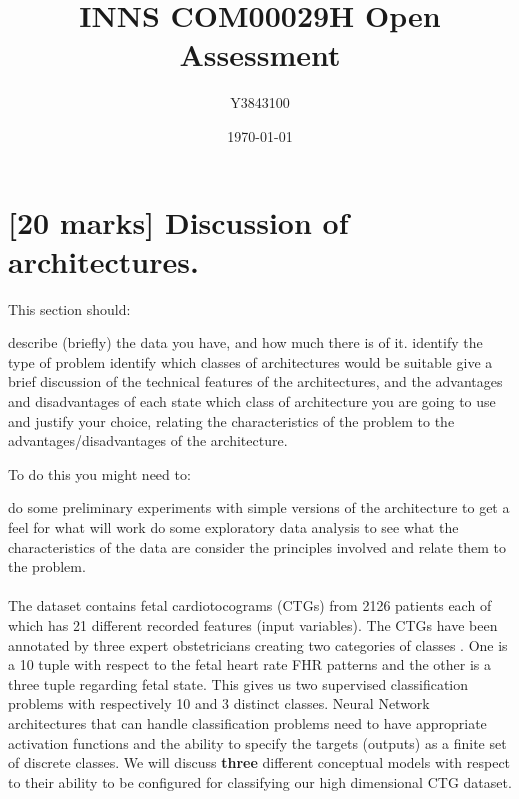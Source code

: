 \documentclass[11pt,a4paper]{article}
\title{INNS COM00029H Open Assessment}
\author{Y3843100}
\date{\today}
\begin{document}


\maketitle


\section{[20 marks] Discussion of architectures.}
\label{sec:discussion}
This section should:
\begin{outline}
  \1 describe (briefly) the data you have, and how much there is of it.
  \1 identify the type of problem
  \1 identify which classes of architectures would be suitable
  \1 give a brief discussion of the technical features of the architectures, and the advantages and disadvantages of each
  \1 state which class of architecture you are going to use and justify your choice, relating the characteristics of the problem to the advantages/disadvantages of the architecture.
\end{outline}

To do this you might need to:
\begin{outline}
  \1 do some preliminary experiments with simple versions of the architecture to get a feel for what will work
  \1 do some exploratory data analysis to see what the characteristics of the data are
  \1 consider the principles involved and relate them to the problem.
\end{outline}

\paragraph{}
The dataset contains fetal cardiotocograms (CTGs) from 2126 patients \autocite{MLforCardio} each of which has 21 different recorded features (input variables). The CTGs have been annotated by three expert obstetricians creating two categories of classes \autocite{Campos:2000}. One is a 10 tuple with respect to the fetal heart rate FHR patterns and the other is a three tuple regarding fetal state. This gives us two supervised classification problems with respectively 10 and 3 distinct classes. Neural Network architectures that can handle classification problems need to have appropriate activation functions and the ability to specify the targets (outputs) as a finite set of discrete classes. We will discuss \textbf{three} different conceptual models with respect to their ability to be configured for classifying our high dimensional CTG dataset.
\end{document}
